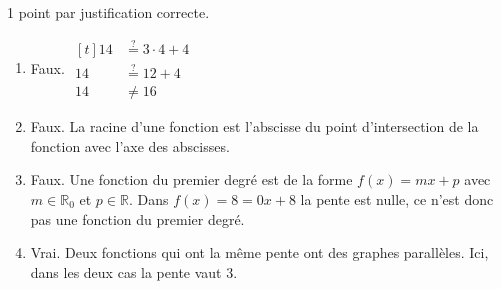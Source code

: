 %
%
    1 point par justification correcte.
    \begin{enumerate}
        \item Faux.
              $\begin{aligned}[t]
                      14 & \stackrel{?}{=} 3\cdot 4+ 4 \\
                      14 & \stackrel{?}{=} 12 + 4      \\
                      14 & \ne 16
                  \end{aligned}$
        \item Faux. La racine d'une fonction est l'abscisse du point d'intersection de la fonction avec l'axe des abscisses.
        \item Faux. Une fonction du premier degré est de la forme $f(x)=mx+p$ avec $m\in \mathbb{R}_0$ et $p \in \mathbb{R}$. Dans $f(x)=8=0x + 8$ la pente est nulle, ce n'est donc pas une fonction du premier degré.
        \item Vrai. Deux fonctions qui ont la même pente ont des graphes parallèles. Ici, dans les deux cas la pente vaut 3.
    \end{enumerate}
